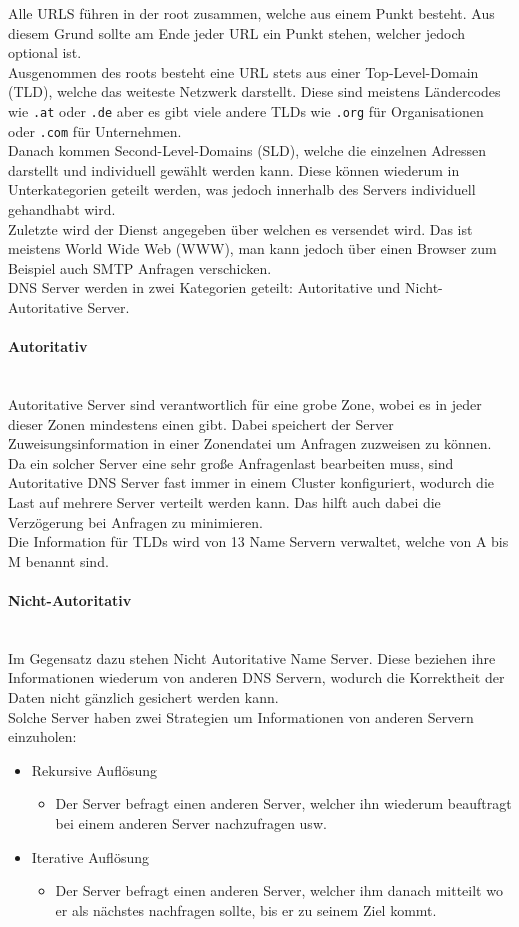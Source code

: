 \documentclass{article}
\newcommand{\paragraphlb}[1]{\paragraph{#1}\mbox{}\\}
\begin{document}
	 Alle URLS führen in der root zusammen, welche aus einem Punkt besteht. Aus diesem Grund sollte am Ende jeder URL ein Punkt stehen, welcher jedoch optional ist. \\
	 Ausgenommen des roots besteht eine URL stets aus einer Top-Level-Domain (TLD), welche das weiteste Netzwerk darstellt. Diese sind meistens Ländercodes wie \verb|.at| oder \verb|.de| aber es gibt viele andere TLDs wie \verb|.org| für Organisationen oder \verb|.com| für Unternehmen. \\
	 Danach kommen Second-Level-Domains (SLD), welche die einzelnen Adressen darstellt und individuell gewählt werden kann. Diese können wiederum in Unterkategorien geteilt werden, was jedoch innerhalb des Servers individuell gehandhabt wird. \\
	 Zuletzte wird der Dienst angegeben über welchen es versendet wird. Das ist meistens World Wide Web (WWW), man kann jedoch über einen Browser zum Beispiel auch SMTP Anfragen verschicken. \\
	 DNS Server werden in zwei Kategorien geteilt: Autoritative und Nicht-Autoritative Server. \\
	 \paragraphlb{Autoritativ}
	 Autoritative Server sind verantwortlich für eine grobe Zone, wobei es in jeder dieser Zonen mindestens einen gibt. Dabei speichert der Server Zuweisungsinformation in einer Zonendatei um Anfragen zuzweisen zu können. Da ein solcher Server eine sehr große Anfragenlast bearbeiten muss, sind Autoritative DNS Server fast immer in einem Cluster konfiguriert, wodurch die Last auf mehrere Server verteilt werden kann. Das hilft auch dabei die Verzögerung bei Anfragen zu minimieren. \\
	 Die Information für TLDs wird von 13 Name Servern verwaltet, welche von A bis M benannt sind.
	 \paragraphlb{Nicht-Autoritativ}
	 Im Gegensatz dazu stehen Nicht Autoritative Name Server. Diese beziehen ihre Informationen wiederum von anderen DNS Servern, wodurch die Korrektheit der Daten nicht gänzlich gesichert werden kann. \\
	 Solche Server haben zwei Strategien um Informationen von anderen Servern einzuholen:
	 \begin{itemize}
	 	\item{Rekursive Auflösung}
	 	\begin{itemize}
	 		\item{Der Server befragt einen anderen Server, welcher ihn wiederum beauftragt bei einem anderen Server nachzufragen usw.}
	 	\end{itemize}
	 	\item{Iterative Auflösung}
	 	\begin{itemize}
	 		\item{Der Server befragt einen anderen Server, welcher ihm danach mitteilt wo er als nächstes nachfragen sollte, bis er zu seinem Ziel kommt.}
	 	\end{itemize}
	 \end{itemize}
\end{document}
